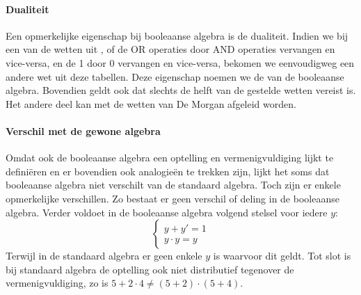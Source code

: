 \paragraph{Dualiteit}Een opmerkelijke eigenschap bij booleaanse algebra is de dualiteit. Indien we bij een van de wetten uit ,  of  de OR operaties door AND operaties vervangen en vice-versa, en de 1 door 0 vervangen en vice-versa, bekomen we eenvoudigweg een andere wet uit deze tabellen. Deze eigenschap noemen we de  van de booleaanse algebra. Bovendien geldt ook dat slechts de helft van de gestelde wetten vereist is. Het andere deel kan met de wetten van De Morgan afgeleid worden.
\paragraph{Verschil met de gewone algebra}Omdat ook de booleaanse algebra een optelling en vermenigvuldiging lijkt te defini\"eren en er bovendien ook analogie\"en te trekken zijn, lijkt het soms dat booleaanse algebra niet verschilt van de standaard algebra. Toch zijn er enkele opmerkelijke verschillen. Zo bestaat er geen verschil of deling in de booleaanse algebra. Verder voldoet in de booleaanse algebra volgend stelsel voor iedere $y$:
\begin{equation}
\left\{\begin{array}{l}
y+y'=1\\
y\cdot y=y
\end{array}\right.
\end{equation}
Terwijl in de standaard algebra er geen enkele $y$ is waarvoor dit geldt. Tot slot is bij standaard algebra de optelling ook niet distributief tegenover de vermenigvuldiging, zo is $5+2\cdot4\neq(5+2)\cdot(5+4)$.
